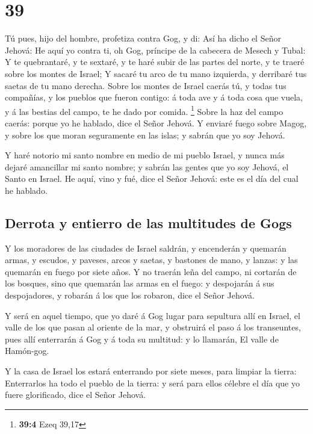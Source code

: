\hypertarget{section-38}{%
\section{39}\label{section-38}}

 Tú pues, hijo del hombre, profetiza contra Gog, y di: Así
ha dicho el Señor Jehová: He aquí yo contra ti, oh Gog, príncipe de la
cabecera de Mesech y Tubal:  Y te quebrantaré, y te
sextaré, y te haré subir de las partes del norte, y te traeré sobre los
montes de Israel;  Y sacaré tu arco de tu mano izquierda,
y derribaré tus saetas de tu mano derecha.  Sobre los
montes de Israel caerás tú, y todas tus compañías, y los pueblos que
fueron contigo: á toda ave y á toda cosa que vuela, y á las bestias del
campo, te he dado por comida. \footnote{\textbf{39:4} Ezeq 39,17}
 Sobre la haz del campo caerás: porque yo he hablado, dice
el Señor Jehová.  Y enviaré fuego sobre Magog, y sobre los
que moran seguramente en las islas; y sabrán que yo soy Jehová.

 Y haré notorio mi santo nombre en medio de mi pueblo
Israel, y nunca más dejaré amancillar mi santo nombre; y sabrán las
gentes que yo soy Jehová, el Santo en Israel.  He aquí,
vino y fué, dice el Señor Jehová: este es el día del cual he hablado.

\hypertarget{derrota-y-entierro-de-las-multitudes-de-gogs}{%
\subsection{Derrota y entierro de las multitudes de
Gogs}\label{derrota-y-entierro-de-las-multitudes-de-gogs}}

 Y los moradores de las ciudades de Israel saldrán, y
encenderán y quemarán armas, y escudos, y paveses, arcos y saetas, y
bastones de mano, y lanzas: y las quemarán en fuego por siete años.
 Y no traerán leña del campo, ni cortarán de los bosques,
sino que quemarán las armas en el fuego: y despojarán á sus
despojadores, y robarán á los que los robaron, dice el Señor Jehová.

 Y será en aquel tiempo, que yo daré á Gog lugar para
sepultura allí en Israel, el valle de los que pasan al oriente de la
mar, y obstruirá el paso á los transeuntes, pues allí enterrarán á Gog y
á toda su multitud: y lo llamarán, El valle de Hamón-gog.

 Y la casa de Israel los estará enterrando por siete
meses, para limpiar la tierra:  Enterrarlos ha todo el
pueblo de la tierra: y será para ellos célebre el día que yo fuere
glorificado, dice el Señor Jehová.

